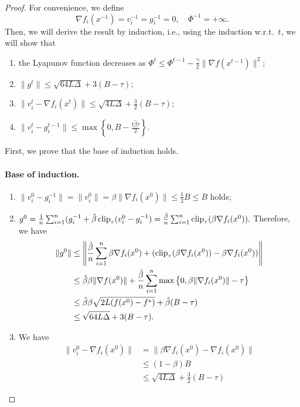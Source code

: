 \documentclass[a4paper,11pt]{article}
\begin{document}
\begin{proof}
    For convenience, we define
    $$\nabla f_i(x^{-1}) = v_i^{-1} = g_i^{-1} = 0, \quad \Phi^{-1} = +\infty.$$ 
    Then, we will derive the result by induction, i.e., using the induction w.r.t.\ $t$, we will show that 
    \begin{enumerate}
    \item the Lyapunov function decreases as $\Phi^{t} \le \Phi^{t-1} - \frac{\gamma}{2}\|\nabla f(x^{t-1})\|^2;$
    \item $\|g^t\| \le \sqrt{64L\Delta} + 3(B-\tau)$;
    \item $\|v_i^t - \nabla f_i(x^t)\| \le \sqrt{4L\Delta} + \frac{3}{2}(B-\tau);$
    \item $\|v_i^t - g_i^{t-1}\| \le \max\left\{0, B -\frac{t\hat{\beta}\tau}{2}\right\}.$
    \end{enumerate}
    First, we prove that the base of induction holds.

    \paragraph{Base of induction.}
    \begin{enumerate}
        \item $\|v_i^0 - g_i^{-1}\| = \|v_i^0\| = \beta\|\nabla f_i(x^0)\| \le \frac{1}{2}B \le B$ holds;


        \item $g^0 = \frac{1}{n}\sum_{i=1}^n (g_i^{-1} + \hat{\beta}\operatorname{clip}_\tau(v_i^0 - g_i^{-1}) = \frac{\hat{\beta}}{n}\sum_{i=1}^n\operatorname{clip}_\tau(\beta\nabla f_i(x^0)).$ Therefore, we have
        \begin{align*}
           \|g^0\| &\le \left\|\frac{\hat{\beta}}{n}\sum_{i=1}^n\beta\nabla f_i(x^0) + (\operatorname{clip}_\tau(\beta\nabla f_i(x^0)) - \beta\nabla f_i(x^0))\right\|\\
           &\le \hat{\beta}\beta\|\nabla f(x^0)\| 
           + \frac{\hat{\beta}}{n}\sum_{i=1}^n\max\left\{0, \beta\|\nabla f_i(x^0)\| - \tau\right\}\\
           &\le \hat{\beta}\beta\sqrt{2L(f(x^0)-f^*)} 
           + \hat{\beta}(B - \tau)\\
           &\le \sqrt{64L\Delta} 
           + 3(B-\tau).
        \end{align*}

        \item We have 
        \begin{align*}
           \|v_i^0 - \nabla f_i(x^0)\| &= \|\beta\nabla f_i(x^0) - \nabla f_i(x^0)\|\\
           &\le (1-\beta)B\\
           &\le \sqrt{4L\Delta} + \frac{3}{2}(B-\tau)
        \end{align*}
        

\end{enumerate}
\end{proof}
\end{document}
